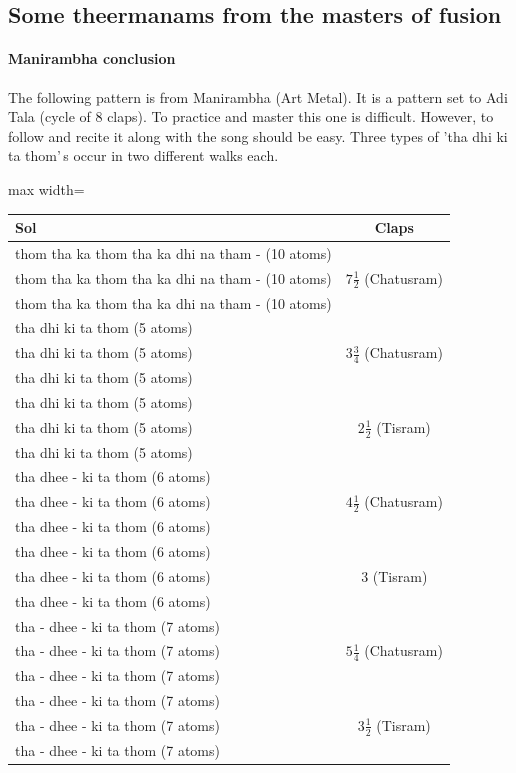 \subsection{Some theermanams from the masters of fusion}

\paragraph{Manirambha conclusion}
The following pattern is from Manirambha (Art Metal). It is a pattern set to Adi Tala
(cycle of 8 claps). To practice and master this one is difficult. However, to follow
and recite it along with the song should be easy. Three types of 'tha dhi ki ta
thom'\,s occur in two different walks each.

\begin{center}
\begin{adjustbox}{max width=\textwidth}
\begin{tabular}{l c}
\toprule
Sol & Claps\\
\midrule
thom tha ka thom tha ka dhi na tham - (10 atoms) & \multirow{3}{*}{$7\frac{1}{2}$ (Chatusram)}\\
thom tha ka thom tha ka dhi na tham - (10 atoms) & \\
thom tha ka thom tha ka dhi na tham - (10 atoms) & \\
\midrule
tha dhi ki ta thom (5 atoms) & \multirow{3}{*}{$3\frac{3}{4}$ (Chatusram)}\\
tha dhi ki ta thom (5 atoms) & \\
tha dhi ki ta thom (5 atoms) & \\
\midrule
tha dhi ki ta thom (5 atoms) & \multirow{3}{*}{$2\frac{1}{2}$ (Tisram)}\\
tha dhi ki ta thom (5 atoms) & \\
tha dhi ki ta thom (5 atoms) & \\
\midrule
tha dhee - ki ta thom (6 atoms) & \multirow{3}{*}{$4\frac{1}{2}$ (Chatusram)}\\
tha dhee - ki ta thom (6 atoms) & \\
tha dhee - ki ta thom (6 atoms) & \\
\midrule
tha dhee - ki ta thom (6 atoms) & \multirow{3}{*}{$3$ (Tisram)}\\
tha dhee - ki ta thom (6 atoms) & \\
tha dhee - ki ta thom (6 atoms) & \\
\midrule
tha - dhee - ki ta thom (7 atoms) & \multirow{3}{*}{$5\frac{1}{4}$ (Chatusram)}\\
tha - dhee - ki ta thom (7 atoms) & \\
tha - dhee - ki ta thom (7 atoms) & \\
\midrule
tha - dhee - ki ta thom (7 atoms) & \multirow{3}{*}{$3\frac{1}{2}$ (Tisram)}\\
tha - dhee - ki ta thom (7 atoms) & \\
tha - dhee - ki ta thom (7 atoms) & \\
\bottomrule
\end{tabular}
\end{adjustbox}
\end{center}

